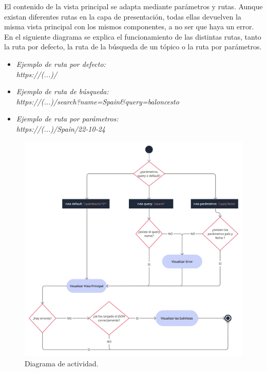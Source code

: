 El contenido de la vista principal se adapta mediante parámetros y rutas. Aunque existan diferentes rutas en la capa de presentación, todas ellas devuelven la misma vista principal con los mismos componentes, a no ser que haya un error. En el siguiente diagrama se explica el funcionamiento de las distintas rutas, tanto la ruta por defecto, la ruta de la búsqueda de un tópico o la ruta por parámetros.

\begin{itemize}
    \item
    \textit{Ejemplo de ruta por defecto: \\
    https://(...)/}
    \item
    \textit{Ejemplo de ruta de búsqueda: \\
    https://(...)/search?name=Spain\&query=baloncesto}
    \item
    \textit{Ejemplo de ruta por parámetros: \\
    https://(...)/Spain/22-10-24}
\end{itemize}

\begin{figure}[H]
    \centering
    \myfloatalign
    \includegraphics[width=1.001\textwidth]{gfx/Diagrama-actividad.png}
    \caption[Diagrama de actividad]{Diagrama de actividad.}\label{gfx:Diagrama-actividad}
\end{figure}


